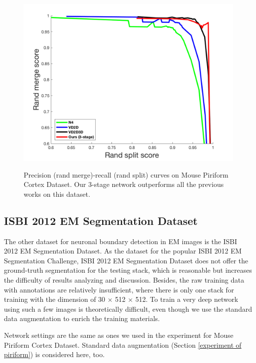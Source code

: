 \documentclass[senior]{IPSstyle}
\begin{document}
\begin{figure}[t]
  \centering
  \includegraphics[width=15cm]{piriform prcurve.png}\\
  \caption{Precision (rand merge)-recall (rand split) curves on Mouse Piriform Cortex Dataset\cite{Lee2015}. Our 3-stage network outperforms all the previous works on this dataset.}\label{piriform prcurve}
\end{figure}

\subsection{ISBI 2012 EM Segmentation Dataset}
The other dataset for neuronal boundary detection in EM images is the ISBI 2012 EM Segmentation Dataset. As the dataset for the popular ISBI 2012 EM Segmentation Challenge, ISBI 2012 EM Segmentation Dataset does not offer the ground-truth segmentation for the testing stack, which is reasonable but increases the difficulty of results analyzing and discussion. Besides, the raw training data with annotations are relatively insufficient, where there is only one stack for training with the dimension of 30 \(\times\) 512 \(\times\) 512. To train a very deep network using such a few images is theoretically difficult, even though we use the standard data augmentation to enrich the training materials. 

Network settings are the same as ones we used in the experiment for Mouse Piriform Cortex Dataset\cite{Lee2015}. Standard data augmentation (Section \ref{experiment of piriform}) is considered here, too.
\end{document}
